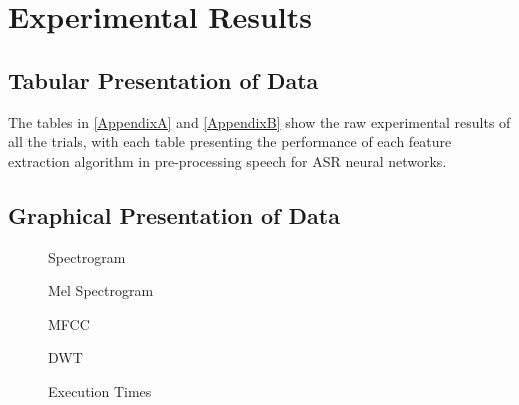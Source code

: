 
\chapter{Experimental Results} %

\label{Results} %


\section{Tabular Presentation of Data}

The tables in \autoref{AppendixA} and \autoref{AppendixB} show the raw experimental results of all the trials, with each table presenting the performance of each feature extraction algorithm in pre-processing speech for ASR neural networks.


\section{Graphical Presentation of Data}

\begin{figure}[th]
    \centering
    
    \caption[Spectrogram]{Spectrogram}
    \label{fig:SpectrogramEpochLoss}
\end{figure}

\begin{figure}[th]
    \centering
    
    \caption[Mel Spectrogram]{Mel Spectrogram}
    \label{fig:MelSpectrogramEpochLoss}
\end{figure}

\begin{figure}[th]
    \centering
    
    \caption[MFCC]{MFCC}
    \label{fig:MFCCEpochLoss}
\end{figure}

\begin{figure}[th]
    \centering
    
    \caption[DWT]{DWT}
    \label{fig:DWTEpochLoss}
\end{figure}

\begin{figure}[th]
    \centering
    
    \caption[Execution Times]{Execution Times}
    \label{fig:ExecutionTimes}
\end{figure}